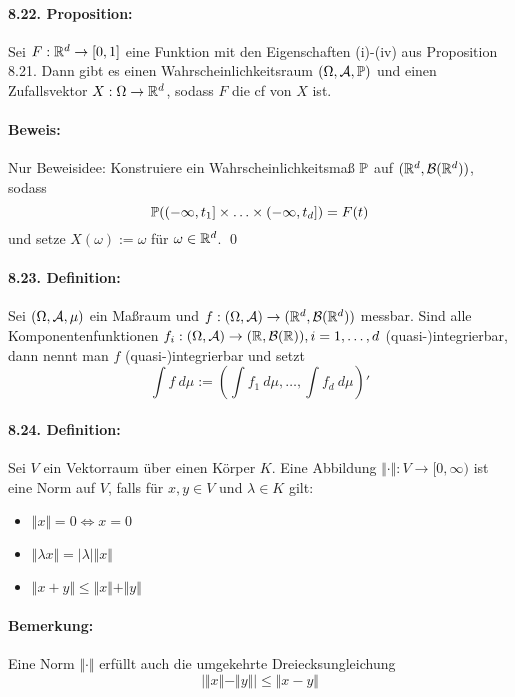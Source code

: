 \paragraph{8.22. Proposition:}Sei $F:\mathbb{R}^d\to[0,1]$ eine Funktion mit den Eigenschaften (i)-(iv) aus Proposition 8.21. Dann gibt es einen Wahrscheinlichkeitsraum $(\Omega, \mathcal{A}, \mathbb{P})$ und einen Zufallsvektor $X:\Omega\to\mathbb{R}^d$, sodass $F$ die cf von $X$ ist.

\paragraph{Beweis:}Nur Beweisidee: Konstruiere ein Wahrscheinlichkeitsma\ss{} $\mathbb{P}$ auf $(\mathbb{R}^d,\mathcal{B}(\mathbb{R}^d))$, sodass 
$$\mathbb{P}((-\infty,t_1]\times\hdots\times(-\infty,t_d])=F(t)$$
und setze $X(\omega):=\omega$ f\"ur $\omega\in\mathbb{R}^d$. \qed

\paragraph{8.23. Definition:}Sei $(\Omega,\mathcal{A},\mu)$ ein Ma\ss{}raum und $f:(\Omega,\mathcal{A})\to(\mathbb{R}^d,\mathcal{B}(\mathbb{R}^d))$ messbar. Sind alle Komponentenfunktionen $f_i:(\Omega,\mathcal{A})\to(\mathbb{R},\mathcal{B}(\mathbb{R})),i=1,\hdots,d$ (quasi-)integrierbar, dann nennt man $f$ (quasi-)integrierbar und setzt
$$\int f\ d\mu:=\left(\int f_1\ d\mu,\hdots,\int f_d\ d\mu\right)'$$


\paragraph{8.24. Definition:}Sei $V$ ein Vektorraum \"uber einen K\"orper $K$. Eine Abbildung $\Vert\cdot\Vert:V\to[0,\infty)$ ist eine Norm auf $V$, falls f\"ur $x,y\in V$ und $\lambda\in K$ gilt:
\begin{itemize}
    \item $\Vert x\Vert=0\iff x=0$
    \item $\Vert\lambda x\Vert=|\lambda|\Vert x\Vert$
    \item $\Vert x+y\Vert\leq\Vert x\Vert+\Vert y\Vert$
\end{itemize}

\paragraph{Bemerkung:}Eine Norm $\Vert\cdot\Vert$ erf\"ullt auch die umgekehrte Dreiecksungleichung
$$\left|\Vert x\Vert-\Vert y\Vert\right|\leq\Vert x-y\Vert$$

